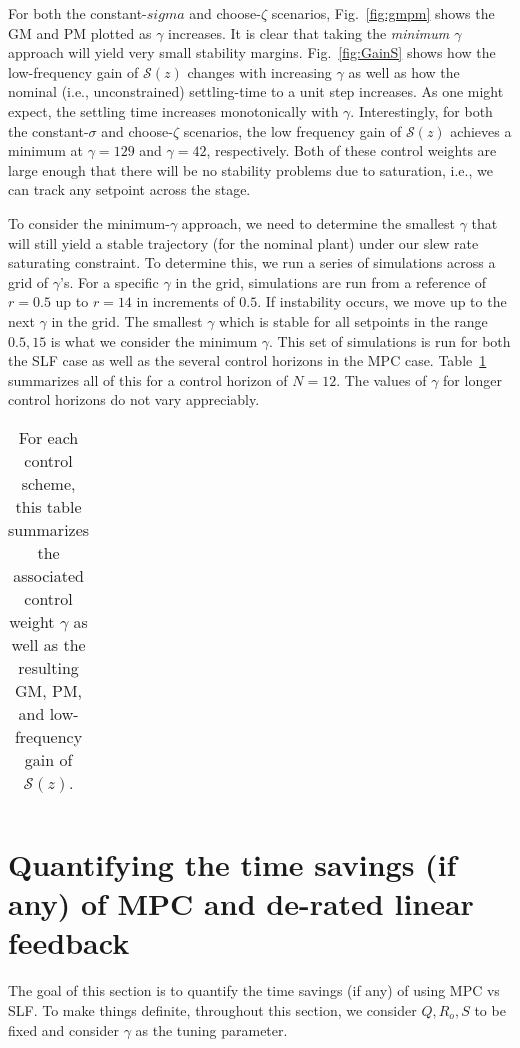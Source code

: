 \documentclass[journal,twocolumn,twoside]{IEEEtran}
\begin{document}
For both the constant-$sigma$ and choose-$\zeta$ scenarios, Fig.~\ref{fig:gmpm} shows the GM and PM plotted as $\gamma$ increases. It is clear that taking the \emph{minimum $\gamma$} approach will yield very small stability margins. Fig.~\ref{fig:GainS} shows how the low-frequency gain of $\mathcal{S}(z)$ changes with increasing $\gamma$ as well as how the nominal (i.e., unconstrained) settling-time to a unit step increases. As one might expect, the settling time increases monotonically with $\gamma$. Interestingly, for both the constant-$\sigma$ and choose-$\zeta$ scenarios, the low frequency gain of $\mathcal{S}(z)$ achieves a minimum at $\gamma=129$ and $\gamma=42$, respectively. Both of these control weights are large enough that there will be no stability problems due to saturation, i.e., we can track any setpoint across the stage.

To consider the minimum-$\gamma$ approach, we need to determine the smallest $\gamma$ that will still yield a stable trajectory (for the nominal plant) under our slew rate saturating constraint. To determine this, we run a series of simulations across a grid of $\gamma$'s. For a specific $\gamma$ in the grid, simulations are run from a reference of $r=0.5$ up to $r=14$ in increments of $0.5$. If instability occurs, we move up to the next $\gamma$ in the grid. The smallest $\gamma$ which is stable for all setpoints in the range $0.5, 15$ is what we consider the minimum $\gamma$. This set of simulations is run for both the SLF case as well as the several control horizons in the MPC case. Table~\ref{tab:gmpms} summarizes all of this for a control horizon of $N=12$. The values of $\gamma$ for longer control horizons do not vary appreciably. 

\begin{table}
  \caption{For each control scheme, this table summarizes the associated control weight $\gamma$ as well as the resulting GM, PM, and low-frequency gain of $\mathcal{S}(z)$.}
  \label{tab:gmpms}
  \begin{tabular}{ccccc}
    
  \end{tabular}
\end{table}

\section{Quantifying the time savings (if any) of MPC and de-rated linear feedback}
\label{sec:org7edf36d}
The goal of this section is to quantify the time savings (if any) of using MPC vs SLF. To make things definite, throughout this section, we consider $Q, R_o, S$ to be fixed and consider $\gamma$ as the tuning parameter.
\end{document}
